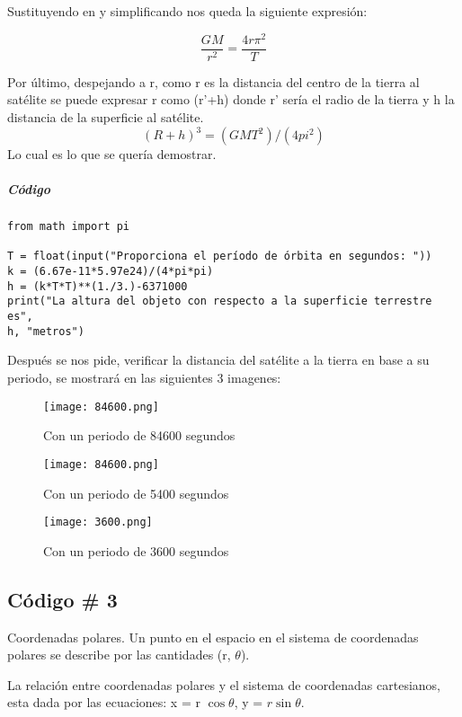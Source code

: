\documentclass[12pt]{article}
\begin{document}
Sustituyendo \label{4} en \label{3} y simplificando nos queda la siguiente expresión:

\begin{equation}
\frac{GM}{r^2}=\frac{4r\pi^2}{T}
\end{equation}

Por último, despejando a r, como r es la distancia del centro de la tierra al satélite se puede expresar r como (r'+h) donde r' sería el radio de la tierra y h la distancia de la superficie al satélite.
\begin{equation}
(R + h)^3 = (GMT^2)/(4 pi^2)
\end{equation}
Lo cual es lo que se quería demostrar.
\subparagraph{Código}
\begin{verbatim}
from math import pi

T = float(input("Proporciona el período de órbita en segundos: "))
k = (6.67e-11*5.97e24)/(4*pi*pi)
h = (k*T*T)**(1./3.)-6371000
print("La altura del objeto con respecto a la superficie terrestre es",
h, "metros")

\end{verbatim}
 
Después se nos pide, verificar la distancia del satélite a la tierra en base a su periodo, se mostrará en las siguientes 3 imagenes:

\begin{figure}[H]
   \centering
    \texttt{[image: 84600.png]}
    \caption{Con un periodo de 84600 segundos}
\end{figure}


\begin{figure}[H]
   \centering
    \texttt{[image: 84600.png]}
    \caption{Con un periodo de 5400 segundos}
\end{figure}


\begin{figure}[H]
   \centering
    \texttt{[image: 3600.png]}
    \caption{Con un periodo de 3600 segundos}
\end{figure}
\subsection{Código \# 3}

Coordenadas polares. Un punto en el espacio en el sistema de coordenadas polares se describe por las cantidades (r, $\theta$).

 

La relación entre coordenadas polares y el sistema de coordenadas cartesianos, esta dada por las ecuaciones:  x = r $\cos \theta$, y = $r \sin \theta$.
\end{document}
